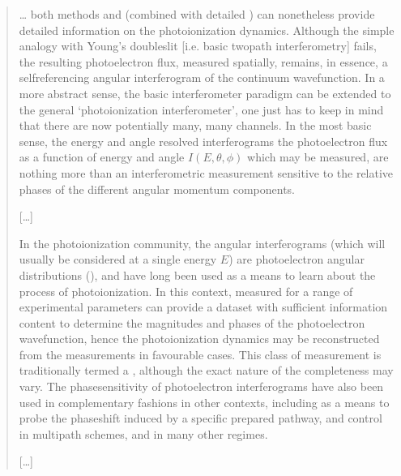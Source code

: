 \documentclass[letterpaper,table,10pt,english]{jupyterBook}
\begin{document}
\begin{quote}

\sphinxAtStartPar
… both  methods and  (combined with detailed ) can nonetheless provide detailed information on the photoionization dynamics. Although the simple analogy with Young’s double\sphinxhyphen{}slit {[}i.e. basic two\sphinxhyphen{}path interferometry{]} fails, the resulting photoelectron flux, measured spatially, remains, in essence, a self\sphinxhyphen{}referencing angular interferogram of the continuum wavefunction. In a more abstract sense, the basic interferometer paradigm can be extended to the general ‘photoionization interferometer’, one just has to keep in mind that there are now potentially many, many channels. In the most basic sense, the energy and angle resolved interferograms \sphinxhyphen{} the photoelectron flux as a function of energy and angle \(I(E,\theta,\phi)\) \sphinxhyphen{} which may be measured, are nothing more than an interferometric measurement sensitive to the relative phases of the different angular momentum components.

\sphinxAtStartPar
{[}…{]}

\sphinxAtStartPar
In the photoionization community, the angular interferograms (which will usually be considered at a single energy \(E\)) are photoelectron angular distributions ({\hyperref[\detokenize{backmatter/glossary:term-PADs}]{}}), and have long been used as a means to learn about the process of photoionization. In this context, {\hyperref[\detokenize{backmatter/glossary:term-PADs}]{}} measured for a range of experimental parameters can provide a dataset with sufficient information content to determine the magnitudes and phases of the photoelectron wavefunction, hence the photoionization dynamics may be reconstructed from the measurements in favourable cases. This class of measurement is traditionally termed a , although the exact nature of the completeness may vary. The phase\sphinxhyphen{}sensitivity of photoelectron interferograms have also been used in complementary fashions in other contexts, including as a means to probe the phase\sphinxhyphen{}shift induced by a specific prepared pathway, and control in multipath schemes, and in many other regimes.

\sphinxAtStartPar
{[}…{]}


\end{quote}
\end{document}
